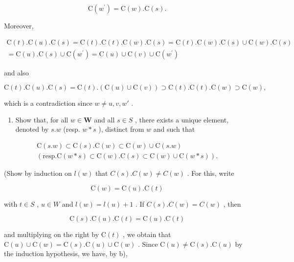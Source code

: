 \[
\mathrm{C} (w ^ {\prime}) = \mathrm{C} (w). \mathrm{C} (s).
\]

Moreover,

\[
\begin{array}{c} \mathrm{C} (t). \mathrm{C} (u). \mathrm{C} (s) = \mathrm{C} (t). \mathrm{C} (t). \mathrm{C} (w). \mathrm{C} (s) = \mathrm{C} (t). \mathrm{C} (w). \mathrm{C} (s) \cup \mathrm{C} (w). \mathrm{C} (s) \\ = \mathrm{C} (u). \mathrm{C} (s) \cup \mathrm{C} (w ^ {\prime}) = \mathrm{C} (u) \cup \mathrm{C} (v) \cup \mathrm{C} (w ^ {\prime}) \end{array}
\]

and also

\[
\mathrm{C} (t). \mathrm{C} (u). \mathrm{C} (s) = \mathrm{C} (t). (\mathrm{C} (u) \cup \mathrm{C} (v)) \supset \mathrm{C} (t). \mathrm{C} (t). \mathrm{C} (w) \supset \mathrm{C} (w),
\]

which is a contradiction since \(w \neq u, v, w'\) .

\begin{enumerate}
\def\labelenumi{\alph{enumi})}
\setcounter{enumi}{2}
\tightlist
\item
  Show that, for all \(w \in \mathbf{W}\) and all \(s \in S\) , there exists a unique element, denoted by \(s.w\) (resp. \(w * s\) ), distinct from \(w\) and such that
\end{enumerate}

\[
\begin{array}{c} \mathrm{C} (s. w) \subset \mathrm{C} (s). \mathrm{C} (w) \subset \mathrm{C} (w) \cup \mathrm{C} (s. w) \\ (\text {resp.} \mathrm{C} (w * s) \subset \mathrm{C} (w). \mathrm{C} (s) \subset \mathrm{C} (w) \cup \mathrm{C} (w * s)). \end{array}
\]

(Show by induction on \(l(w)\) that \(C(s).C(w) \neq C(w)\) . For this, write

\[
\mathrm{C} (w) = \mathrm{C} (u). \mathrm{C} (t)
\]

with \(t \in S\) , \(u \in W\) and \(l(w) = l(u) + 1\) . If \(C(s).C(w) = C(w)\) , then

\[
\mathrm{C} (s). \mathrm{C} (u). \mathrm{C} (t) = \mathrm{C} (u). \mathrm{C} (t)
\]

and multiplying on the right by \(\mathrm{C}(t)\) , we obtain that \(\mathrm{C}(u) \cup \mathrm{C}(w) = \mathrm{C}(s).\mathrm{C}(u) \cup \mathrm{C}(w)\) . Since \(\mathrm{C}(u) \neq \mathrm{C}(s).\mathrm{C}(u)\) by the induction hypothesis, we have, by b),


